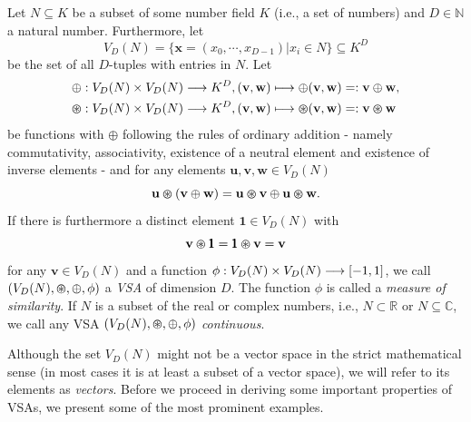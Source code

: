 \begin{defn}
	\label{def:VSA}
	Let $N \subseteq K$ be a subset of some number field $K$ (i.e., a set of numbers) and $D \in \mathbb{N}$ a natural number.
	Furthermore, let
	\[V_{D}(N)=\{ \mathbf{x}=\left(x_{0}, \cdots, x_{D-1}\right)  | x_{i} \in N\} \subseteq K^{D}\]
	be the set of all $D$-tuples with entries in $N$.
	Let
	\begin{align*}
		&\oplus: V_{D}(N) \times V_{D}(N) \longrightarrow K^{D}, ( \mathbf{v}, \mathbf{w}) \longmapsto \oplus( \mathbf{v}, \mathbf{w}) =: \mathbf{v}\oplus \mathbf{w}, \\
		&\varoast: V_{D}(N) \times V_{D}(N) \longrightarrow K^{D}, ( \mathbf{v}, \mathbf{w}) \longmapsto \varoast( \mathbf{v}, \mathbf{w}) =: \mathbf{v}\varoast \mathbf{w}
	\end{align*}
	be functions with $\oplus$ following the rules of ordinary addition - namely commutativity, associativity, existence of a neutral element and existence of inverse elements - and for any elements $ \mathbf{u}, \mathbf{v}, \mathbf{w} \in V_{D}(N)$
	\[ \mathbf{u} \varoast ( \mathbf{v} \oplus \mathbf{w}) = \mathbf{u} \varoast \mathbf{v} \oplus \mathbf{u} \varoast \mathbf{w}.\]
	If there is furthermore a distinct element $\pmb{1} \in V_{D}(N)$ with
	\[ \mathbf{v} \varoast \pmb{1} = \pmb{1} \varoast \mathbf{v} = \mathbf{v}\]
	for any $ \mathbf{v} \in V_{D}(N)$ and a function $\phi: V_{D}(N) \times V_{D}(N) \longrightarrow \left[-1,1\right]$, we call $(V_{D}(N), \varoast, \oplus, \phi)$ a \emph{\acrfull{VSA}} of dimension $D$.
	The function $\phi$ is called a \emph{measure of similarity}.
	If $N$ is a subset of the real or complex numbers, i.e., $N \subset \mathbb{R}$ or $N \subseteq \mathbb{C}$, we call any \ac{VSA} $\left(V_{D}(N), \varoast, \oplus, \phi\right)$ \emph{continuous}.
\end{defn}
Although the set $V_{D}(N)$ might not be a vector space in the strict mathematical sense (in most cases it is at least a subset of a vector space), we will refer to its elements as \emph{vectors}.
Before we proceed in deriving some important properties of \acp{VSA}, we present some of the most prominent examples.

